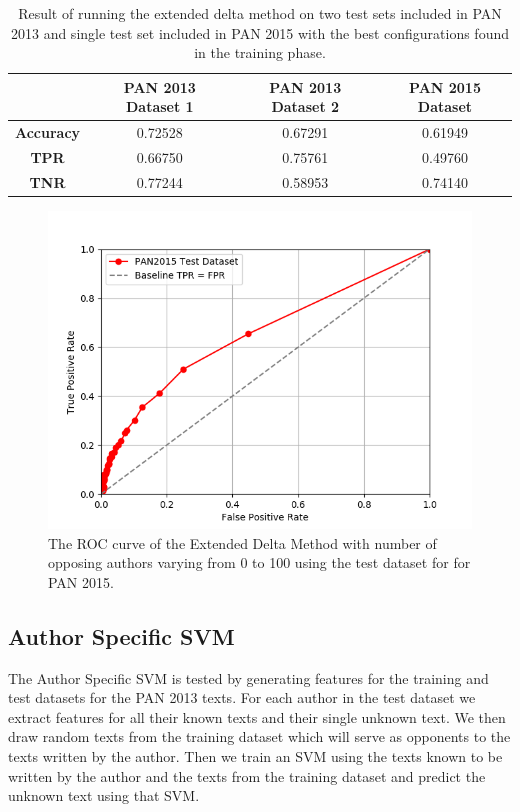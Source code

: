 \begin{table}
    \centering
    \begin{tabular}{c|ccc}
        & \textbf{PAN 2013 Dataset 1} & \textbf{PAN 2013 Dataset 2} & \textbf{PAN 2015 Dataset} \\
        \hline
        \textbf{Accuracy}  & 0.72528 & 0.67291 & 0.61949 \\
        \textbf{\gls{TPR}} & 0.66750 & 0.75761 & 0.49760 \\
        \textbf{\gls{TNR}} & 0.77244 & 0.58953 & 0.74140
    \end{tabular}
    \caption{Result of running the extended delta method on two test sets
    included in PAN 2013 and single test set included in PAN 2015 with the best
    configurations found in the training phase.}
    \label{tab:extended_delta_method_final_results}
\end{table}

\begin{figure}
    \centering
    \includegraphics[width=.7\textwidth]{./pictures/extended_delta_method_roc.png}
    \caption{The ROC curve of the Extended Delta Method with number of opposing
    authors varying from 0 to 100 using the test dataset for for PAN 2015.}
    \label{fig:extended_delta_method_roc}
\end{figure}

\subsection{Author Specific SVM} \label{subsec:results:author_specific_svm}
The Author Specific SVM is tested by generating features for the training and
test datasets for the PAN 2013 texts. For each author in the test
dataset we extract features for all their known texts and their single unknown
text. We then draw random texts from the training dataset which will serve as
opponents to the texts written by the author. Then we train an SVM using the
texts known to be written by the author and the texts from the training dataset
and predict the unknown text using that SVM.

